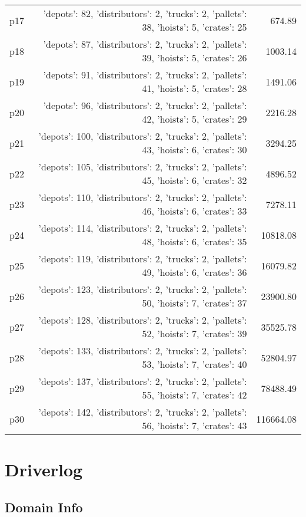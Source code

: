 \documentclass{article}
\begin{document}
\begin{center}
\begin{tabular}{@{}l|r|r@{}}
  p17&{'depots': 82, 'distributors': 2, 'trucks': 2, 'pallets': 38, 'hoists': 5, 'crates': 25}&674.89\\
  p18&{'depots': 87, 'distributors': 2, 'trucks': 2, 'pallets': 39, 'hoists': 5, 'crates': 26}&1003.14\\
  p19&{'depots': 91, 'distributors': 2, 'trucks': 2, 'pallets': 41, 'hoists': 5, 'crates': 28}&1491.06\\
  p20&{'depots': 96, 'distributors': 2, 'trucks': 2, 'pallets': 42, 'hoists': 5, 'crates': 29}&2216.28\\
  p21&{'depots': 100, 'distributors': 2, 'trucks': 2, 'pallets': 43, 'hoists': 6, 'crates': 30}&3294.25\\
  p22&{'depots': 105, 'distributors': 2, 'trucks': 2, 'pallets': 45, 'hoists': 6, 'crates': 32}&4896.52\\
  p23&{'depots': 110, 'distributors': 2, 'trucks': 2, 'pallets': 46, 'hoists': 6, 'crates': 33}&7278.11\\
  p24&{'depots': 114, 'distributors': 2, 'trucks': 2, 'pallets': 48, 'hoists': 6, 'crates': 35}&10818.08\\
  p25&{'depots': 119, 'distributors': 2, 'trucks': 2, 'pallets': 49, 'hoists': 6, 'crates': 36}&16079.82\\
  p26&{'depots': 123, 'distributors': 2, 'trucks': 2, 'pallets': 50, 'hoists': 7, 'crates': 37}&23900.80\\
  p27&{'depots': 128, 'distributors': 2, 'trucks': 2, 'pallets': 52, 'hoists': 7, 'crates': 39}&35525.78\\
  p28&{'depots': 133, 'distributors': 2, 'trucks': 2, 'pallets': 53, 'hoists': 7, 'crates': 40}&52804.97\\
  p29&{'depots': 137, 'distributors': 2, 'trucks': 2, 'pallets': 55, 'hoists': 7, 'crates': 42}&78488.49\\
  p30&{'depots': 142, 'distributors': 2, 'trucks': 2, 'pallets': 56, 'hoists': 7, 'crates': 43}&116664.08
                            \end{tabular}
                            \end{center}
                    
                            \newpage \section{Driverlog}
                    \subsection*{Domain Info}
\end{document}
